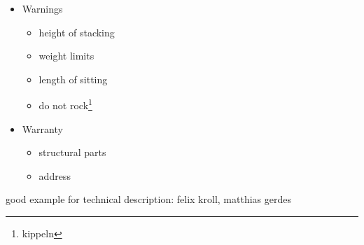 \begin{itemize}
\begin{itemize}
\begin{itemize}
\end{itemize}
\end{itemize}
\item Warnings
\begin{itemize}
\item height of stacking
\item weight limits
\item length of sitting
\item do not rock\footnote{kippeln}
\end{itemize}
\item Warranty
\begin{itemize}
\item structural parts
\item address
\end{itemize}
\end{itemize}

good example for technical description: felix kroll, matthias gerdes


